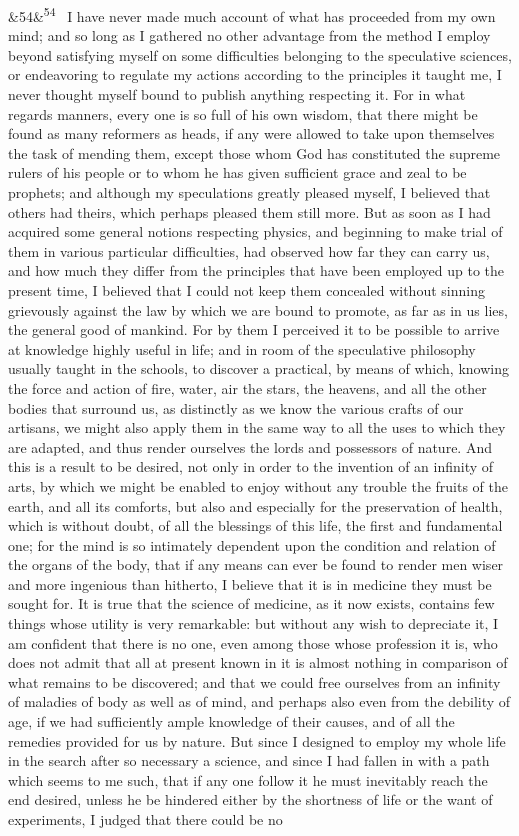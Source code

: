 \documentclass[12pt]{article}
\newcommand{\para}[1][]{\par\noindent\ifx&#1&\else\textsuperscript{\footnotesize #1}~\fi}
\begin{document}
\para[54] I have never made much account of what has proceeded from my own mind; and so long as I gathered no other advantage from the method I employ beyond satisfying myself on some difficulties belonging to the speculative sciences, or endeavoring to regulate my actions according to the principles it taught me, I never thought myself bound to publish anything respecting it. For in what regards manners, every one is so full of his own wisdom, that there might be found as many reformers as heads, if any were allowed to take upon themselves the task of mending them, except those whom God has constituted the supreme rulers of his people or to whom he has given sufficient grace and zeal to be prophets; and although my speculations greatly pleased myself, I believed that others had theirs, which perhaps pleased them still more. But as soon as I had acquired some general notions respecting physics, and beginning to make trial of them in various particular difficulties, had observed how far they can carry us, and how much they differ from the principles that have been employed up to the present time, I believed that I could not keep them concealed without sinning grievously against the law by which we are bound to promote, as far as in us lies, the general good of mankind. For by them I perceived it to be possible to arrive at knowledge highly useful in life; and in room of the speculative philosophy usually taught in the schools, to discover a practical, by means of which, knowing the force and action of fire, water, air the stars, the heavens, and all the other bodies that surround us, as distinctly as we know the various crafts of our artisans, we might also apply them in the same way to all the uses to which they are adapted, and thus render ourselves the lords and possessors of nature. And this is a result to be desired, not only in order to the invention of an infinity of arts, by which we might be enabled to enjoy without any trouble the fruits of the earth, and all its comforts, but also and especially for the preservation of health, which is without doubt, of all the blessings of this life, the first and fundamental one; for the mind is so intimately dependent upon the condition and relation of the organs of the body, that if any means can ever be found to render men wiser and more ingenious than hitherto, I believe that it is in medicine they must be sought for. It is true that the science of medicine, as it now exists, contains few things whose utility is very remarkable: but without any wish to depreciate it, I am confident that there is no one, even among those whose profession it is, who does not admit that all at present known in it is almost nothing in comparison of what remains to be discovered; and that we could free ourselves from an infinity of maladies of body as well as of mind, and perhaps also even from the debility of age, if we had sufficiently ample knowledge of their causes, and of all the remedies provided for us by nature. But since I designed to employ my whole life in the search after so necessary a science, and since I had fallen in with a path which seems to me such, that if any one follow it he must inevitably reach the end desired, unless he be hindered either by the shortness of life or the want of experiments, I judged that there could be no 
\end{document}
